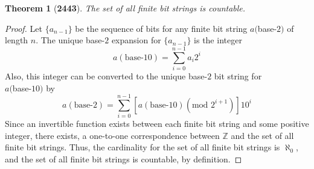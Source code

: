 \documentclass[preview]{standalone}
\newtheorem{theorem}{Theorem}
\begin{document}
\begin{theorem}[\textbf{2443}]
    The set of all finite bit strings is countable.
\end{theorem}

\begin{proof}
    Let $\{a_{n-1}\}$ be the sequence of bits for any finite bit string $a($base-$2)$ of length $n$. 
    The unique base-$2$ expansion for $\{a_{n-1}\}$ is the integer
    $$a(\text{base-}10) = \sum_{i = 0}^{n-1} a_{i}2^{i}$$
    Also, this integer can be converted to the unique base-$2$ bit string for \\ $a($base-$10)$ by 
    $$a(\text{base-}2) = 
    \sum_{i = 0}^{n-1}\left[a(\text{base-}10)(\text{mod } 2^{i+1})\right]10^{i}$$ 
    Since an invertible function exists between each finite bit string and some positive integer, 
    there exists, a one-to-one correspondence between $\mathbb{Z}$ and the set of all 
    finite bit strings. Thus, the cardinality for the set of all finite bit strings is $\aleph_0$,
    and the set of all finite bit strings is countable, by definition.
\end{proof}
\end{document}
